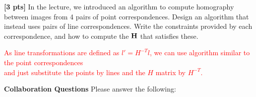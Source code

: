 \documentclass[11pt,addpoints,answers]{exam}
\numberwithin{equation}{section} %
\numberwithin{figure}{section} %
\numberwithin{table}{section} %
\begin{document}
\begin{questions}
\begin{tcolorbox}[fit,height=15cm, width=\textwidth, blank, borderline={0.5pt}{-2pt},halign=left, valign=center, nobeforeafter]



\end{tcolorbox}

\question \textbf{[3 pts]} In the lecture, we introduced an algorithm to compute homography between images from 4 pairs of point correspondences. Design an algorithm that instead uses pairs of line correspondences. Write the constraints provided by each correspondence, and how to compute the $\mathbf{H}$ that satisfies these.

\begin{tcolorbox}[fit,height=5cm, width=\textwidth, blank, borderline={0.5pt}{-2pt},halign=left, valign=center, nobeforeafter]

\textcolor{red}{As line transformations are defined as $l' = H^{-T}l$, we can use algorithm similar to the point correspondences}\\
\textcolor{red}{and just substitute the points by lines and the $H$ matrix by $H^{-T}$.}


\end{tcolorbox}


\end{questions}

\clearpage

\textbf{Collaboration Questions} Please answer the following:
\end{document}
